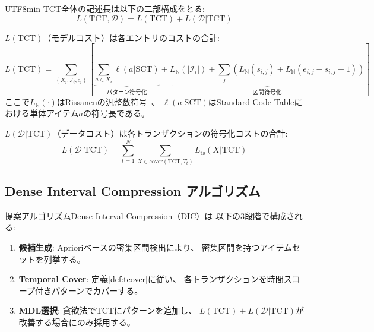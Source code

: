 \documentclass[11pt,a4paper]{article}
\begin{document}
\begin{CJK}{UTF8}{min}
TCT全体の記述長は以下の二部構成をとる:
\begin{equation}\label{eq:tct_total}
  L(\text{TCT}, \mathcal{D}) = L(\text{TCT}) + L(\mathcal{D}|\text{TCT})
\end{equation}

$L(\text{TCT})$（モデルコスト）は各エントリのコストの合計:
\begin{equation}\label{eq:model_cost}
  L(\text{TCT}) = \sum_{(X_i,\mathcal{I}_i,c_i)} \left[
    \underbrace{\sum_{a \in X_i} \ell(a|\text{SCT})}_{\text{パターン符号化}}
    + \underbrace{L_{\mathbb{N}}(|\mathcal{I}_i|) + \sum_{j} \left(L_{\mathbb{N}}(s_{i,j}) + L_{\mathbb{N}}(e_{i,j}-s_{i,j}+1)\right)}_{\text{区間符号化}}
  \right]
\end{equation}
ここで$L_{\mathbb{N}}(\cdot)$はRissanenの汎整数符号~\cite{rissanen1978modeling}、
$\ell(a|\text{SCT})$はStandard Code Tableにおける単体アイテム$a$の符号長である。

$L(\mathcal{D}|\text{TCT})$（データコスト）は各トランザクションの符号化コストの合計:
\begin{equation}\label{eq:data_cost}
  L(\mathcal{D}|\text{TCT}) = \sum_{t=1}^{N} \sum_{X \in \text{cover}(\text{TCT}, T_t)} L_{\text{ts}}(X|\text{TCT})
\end{equation}

\subsection{Dense Interval Compression アルゴリズム}

提案アルゴリズムDense Interval Compression（DIC）は
以下の3段階で構成される:

\begin{enumerate}
  \item \textbf{候補生成}: Aprioriベースの密集区間検出により、
    密集区間を持つアイテムセットを列挙する。
  \item \textbf{Temporal Cover}: 定義\ref{def:tcover}に従い、
    各トランザクションを時間スコープ付きパターンでカバーする。
  \item \textbf{MDL選択}: 貪欲法でTCTにパターンを追加し、
    $L(\text{TCT}) + L(\mathcal{D}|\text{TCT})$が改善する場合にのみ採用する。
\end{enumerate}

\begin{algorithm}[t]
\SetAlgoLined
{}


\end{algorithm}
\end{CJK}
\end{document}
